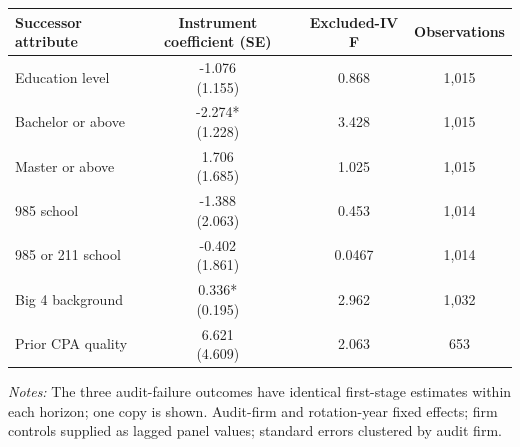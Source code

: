 \documentclass[10pt]{article}
\begin{document}
\begin{minipage}{19cm}\fontsize{10}{12}\selectfont\setlength{\tabcolsep}{4pt}\renewcommand{\arraystretch}{1.12}


\centering
{}
\begin{threeparttable}
\begin{tabular}{p{}ccc}
\toprule
Successor attribute & Instrument coefficient (SE) & Excluded-IV F & Observations \\
\midrule
Education level & \shortstack{-1.076\\(1.155)} & 0.868 & 1,015 \\
Bachelor or above & \shortstack{-2.274*\\(1.228)} & 3.428 & 1,015 \\
Master or above & \shortstack{1.706\\(1.685)} & 1.025 & 1,015 \\
985 school & \shortstack{-1.388\\(2.063)} & 0.453 & 1,014 \\
985 or 211 school & \shortstack{-0.402\\(1.861)} & 0.0467 & 1,014 \\
Big 4 background & \shortstack{0.336*\\(0.195)} & 2.962 & 1,032 \\
Prior CPA quality & \shortstack{6.621\\(4.609)} & 2.063 & 653 \\
\bottomrule
\end{tabular}
\begin{tablenotes}\fontsize{9}{11}\selectfont
\item \raggedright \fontsize{9}{11}\selectfont \textit{Notes:} The three audit-failure outcomes have identical first-stage estimates within each horizon; one copy is shown. Audit-firm and rotation-year fixed effects; firm controls supplied as lagged panel values; standard errors clustered by audit firm.
\end{tablenotes}
\end{threeparttable}

\end{minipage}
\end{document}
